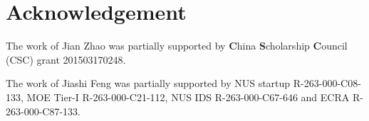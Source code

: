 \documentclass[10pt,twocolumn,letterpaper]{article}
\theoremstyle{definition}
\theoremstyle{remark}
\begin{document}
\vspace{-2mm}
\section*{Acknowledgement}
\vspace{-1mm}

The work of Jian Zhao was partially supported by \textbf{C}hina \textbf{S}cholarship \textbf{C}ouncil (CSC) grant 201503170248.

The work of Jiashi Feng was partially supported by NUS startup R-263-000-C08-133, MOE Tier-I R-263-000-C21-112, NUS IDS R-263-000-C67-646 and ECRA R-263-000-C87-133.

{\small


}
\end{document}

